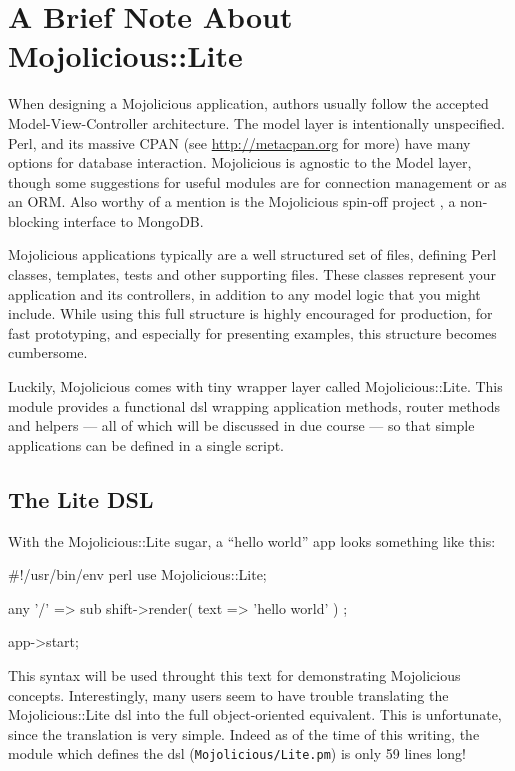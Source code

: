 \section{A Brief Note About Mojolicious::Lite} \label{sec:lite_not_magical}


When designing a Mojolicious application, authors usually follow the accepted Model-View-Controller architecture.
The model layer is intentionally unspecified.
Perl, and its massive CPAN (see \url{http://metacpan.org} for more) have many options for database interaction.
Mojolicious is agnostic to the Model layer, though some suggestions for useful modules are  for connection management or  as an ORM.
Also worthy of a mention is the Mojolicious spin-off project , a non-blocking interface to MongoDB.

Mojolicious applications typically are a well structured set of files, defining Perl classes, templates, tests and other supporting files.
These classes represent your application and its controllers, in addition to any model logic that you might include.
While using this full structure is highly encouraged for production, for fast prototyping, and especially for presenting examples, this structure becomes cumbersome.

Luckily, Mojolicious comes with tiny wrapper layer called Mojolicious::Lite.
This module provides a functional dsl wrapping application methods, router methods and helpers --- all of which will be discussed in due course --- so that simple applications can be defined in a single script.

\subsection{The Lite DSL}

With the Mojolicious::Lite sugar, a ``hello world'' app looks something like this:
\begin{mojolite}
#!/usr/bin/env perl
use Mojolicious::Lite;

any '/' => sub { shift->render( text => 'hello world' ) };

app->start;
\end{mojolite}

This syntax will be used throught this text for demonstrating Mojolicious concepts.
Interestingly, many users seem to have trouble translating the Mojolicious::Lite dsl into the full object-oriented equivalent.
This is unfortunate, since the translation is very simple.
Indeed as of the time of this writing, the module which defines the dsl (\verb!Mojolicious/Lite.pm!) is only 59 lines long!

